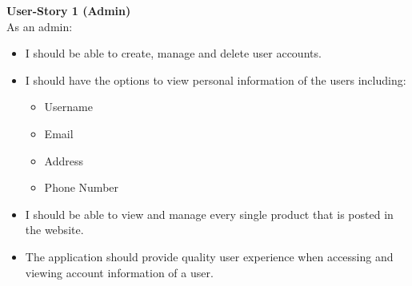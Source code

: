 \documentclass[11pt]{article}
\newcounter{use case ID}
\begin{document}
\textbf{User-Story 1 (Admin)} \\
As an admin:
\begin{itemize}
   \item I should be able to create, manage and delete user accounts.
    \item I should have the options to view personal information of the users including:
        \begin{itemize}
            \item Username
            \item Email
            \item Address
            \item Phone Number
        \end{itemize}
    \item I should be able to view and manage every single product that is posted in the website.
    \item The application should provide quality user experience when accessing and viewing account information of a user.
\end{itemize}
\end{document}
